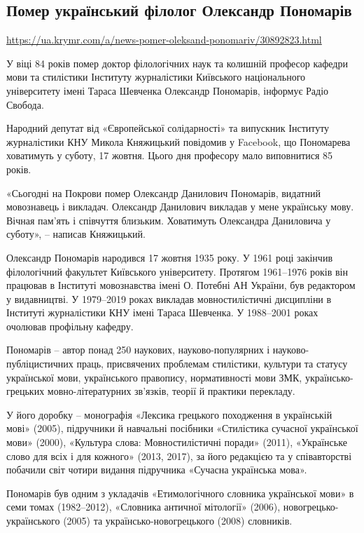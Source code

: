  
 

\subsection{Помер український філолог Олександр Пономарів}

\url{https://ua.krymr.com/a/news-pomer-oleksand-ponomariv/30892823.html}

У віці 84 років помер доктор філологічних наук та колишній професор кафедри
мови та стилістики Інституту журналістики Київського національного університету
імені Тараса Шевченка Олександр Пономарів, інформує Радіо Свобода.

Народний депутат від «Європейської солідарності» та випускник Інституту
журналістики КНУ Микола Княжицький повідомив у Facebook, що Пономарева
ховатимуть у суботу, 17 жовтня. Цього дня професору мало виповнитися 85 років.

«Сьогодні на Покрови помер Олександр Данилович Пономарів, видатний мовознавець
і викладач. Олександр Данилович викладав у мене українську мову. Вічная пам'ять
і співчуття близьким. Ховатимуть Олександра Даниловича у суботу», – написав
Княжицький.

Олександр Пономарів народився 17 жовтня 1935 року. У 1961 році закінчив
філологічний факультет Київського університету. Протягом 1961–1976 років він
працював в Інституті мовознавства імені О. Потебні АН України, був редактором у
видавництві. У 1979–2019 роках викладав мовностилістичні дисципліни в Інституті
журналістики КНУ імені Тараса Шевченка. У 1988–2001 роках очолював профільну
кафедру.

Пономарів – автор понад 250 наукових, науково-популярних і
науково-публіцистичних праць, присвячених проблемам стилістики, культури та
статусу української мови, українського правопису, нормативності мови ЗМК,
українсько-грецьких мовно-літературних зв’язків, теорії й практики перекладу.

У його доробку – монографія «Лексика грецького походження в українській мові»
(2005), підручники й навчальні посібники «Стилістика сучасної української мови»
(2000), «Культура слова: Мовностилістичні поради» (2011), «Українське слово для
всіх і для кожного» (2013, 2017), за його редакцією та у співавторстві побачили
світ чотири видання підручника «Сучасна українська мова».

Пономарів був одним з укладачів «Етимологічного словника української мови» в
семи томах (1982–2012), «Словника античної мітології» (2006),
новогрецько-українського (2005) та українсько-новогрецького (2008) словників.
